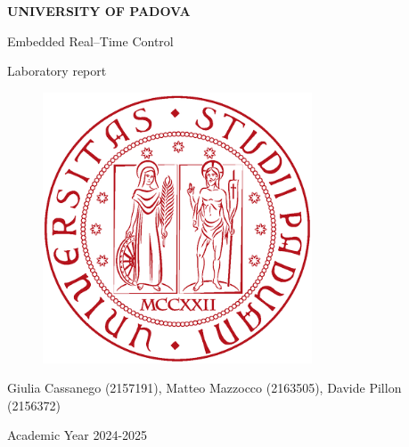 \documentclass[english]{article}
\begin{document}
\begin{titlepage}

	\begin{center}
		\begin{Large} \textbf{UNIVERSITY OF PADOVA} \\
		\end{Large} \vspace{1cm}
		\vspace{3cm}
		\begin{Large} Embedded Real--Time Control \end{Large}
		\par\end{center}

	\begin{center}
		\begin{Large}Laboratory report\\
		\end{Large}
		\par\end{center}

	\begin{center}
		\vspace{2cm}
		\begin{figure}[!htb]
			\centering \includegraphics[width=8cm]{figures/unipd-logo.png}\\

		\end{figure}

		\par\end{center}

	\begin{center}
		\vspace{2cm}
		\begin{Large} Giulia Cassanego (2157191), Matteo Mazzocco (2163505), Davide Pillon (2156372)  \\
		\end{Large} \vspace{2cm}
		\begin{Large} Academic Year 2024-2025 \end{Large}
		\par\end{center}

\end{titlepage}
\end{document}
